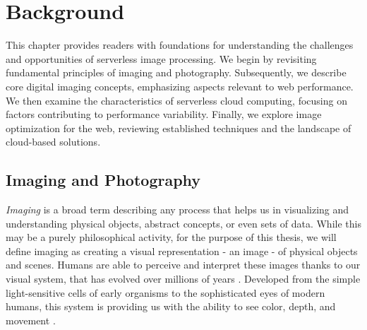\section{Background}
\label{cha:background}

This chapter provides readers with foundations for understanding the challenges and opportunities of serverless image processing. We begin by revisiting fundamental principles of imaging and photography. Subsequently, we describe core digital imaging concepts, emphasizing aspects relevant to web performance. We then examine the characteristics of serverless cloud computing, focusing on factors contributing to performance variability. Finally, we explore image optimization for the web, reviewing established techniques and the landscape of cloud-based solutions.

\subsection{Imaging and Photography}
\label{sec:imaging-and-photography}


\textit{Imaging} is a broad term describing any process that helps us in visualizing and understanding physical objects, abstract concepts, or even sets of data. While this may be a purely philosophical activity, for the purpose of this thesis, we will define imaging as creating a visual representation - an image - of physical objects and scenes. Humans are able to perceive and interpret these images thanks to our visual system, that has evolved over millions of years \cite{land2012animal-eyes}. Developed from the simple light-sensitive cells of early organisms to the sophisticated eyes of modern humans, this system is providing us with the ability to see color, depth, and movement \cite{livingstone-anatomy-physiology-perception}.


